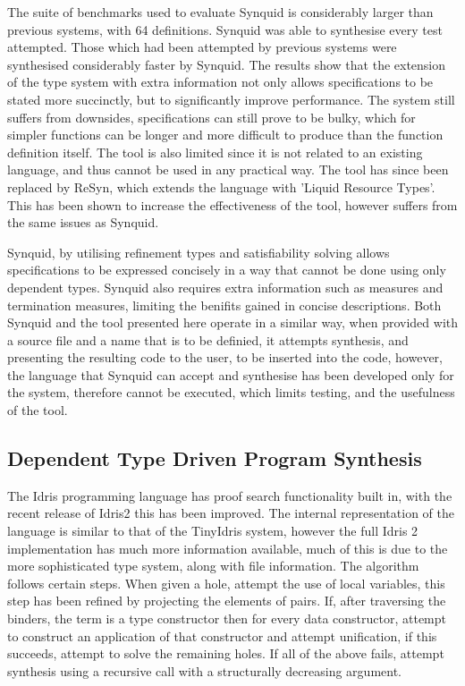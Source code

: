 \documentclass[a4paper]{article}
\begin{document}
The suite of benchmarks used to evaluate Synquid is considerably larger than previous systems, with 64 definitions.
Synquid was able to synthesise every test attempted. Those which had been attempted by previous systems were synthesised 
considerably faster by Synquid. The results show that the extension of the type system with extra information not only allows
specifications to be stated more succinctly, but to significantly improve performance. The system still suffers from downsides, 
specifications can still prove to be bulky, which for simpler functions can be longer and more difficult to produce than the 
function definition itself. The tool is also limited since it is not related to an existing language, and thus cannot be used in
any practical way. The tool has since been replaced by ReSyn, which extends the language with 'Liquid Resource Types'. This has
been shown to increase the effectiveness of the tool, however suffers from the same issues as Synquid.

Synquid, by utilising refinement types and satisfiability solving allows specifications to be expressed concisely in a way that
cannot be done using only dependent types. Synquid also requires extra information such
as measures and termination measures, limiting the benifits gained in concise descriptions. Both Synquid and the tool presented
here operate in a similar way, when provided with a source file and a name that is to be definied, it attempts synthesis, and
presenting the resulting code to the user, to be inserted into the code, however, the language that Synquid can accept and
synthesise has been developed only for the system, therefore cannot be executed, which limits testing, and the usefulness of
the tool.

\subsection{Dependent Type Driven Program Synthesis}
\label{sec:org2385065}
The Idris programming language has proof search functionality built in, with the recent release of Idris2 this has 
been improved. The internal representation of the language is similar to that of the TinyIdris system, 
however the full Idris 2 implementation has much more information available, much of this is due to the more sophisticated 
type system, along with file information. The algorithm follows certain steps. 
When given a hole, attempt the use of local variables, this step has been refined by projecting the elements of pairs.
If, after traversing the binders, the term is a type constructor then for every data
constructor, attempt to construct an application of that constructor and attempt unification, if this succeeds, attempt
to solve the remaining holes. If all of the above fails, attempt synthesis using a recursive call with a structurally 
decreasing argument. 
\end{document}
